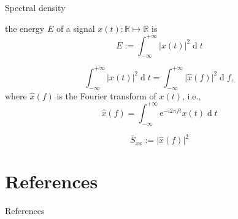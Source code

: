 \documentclass[utf-8, 10pt, aspectratio=1610]{beamer}
\begin{document}
\begin{frame}[allowframebreaks]{Spectral density}
	\begin{definition}[energy]
		the energy \(E\) of a signal \(x(t): \mathbb{R} \mapsto \mathbb{R}\) is
		\begin{equation}
			E := \int_{-\infty}^{+\infty} \vert x(t) \vert^2 \operatorname{d}\! t
		\end{equation}
	\end{definition}
	\begin{theorem}
		\begin{equation}
			\int_{-\infty}^{+\infty} \vert x(t) \vert^2 \operatorname{d}\! t = \int_{-\infty}^{+\infty} \vert \hat{x}(f) \vert^2 \operatorname{d}\! f,
		\end{equation}
		where \(\hat{x}(f)\) is the Fourier transform of \(x(t)\), i.e.,
		\begin{equation}
			\hat{x}(f) = \int_{-\infty}^{+\infty} \mathrm{e}^{-\mathrm{i}2\pi f t} x(t) \operatorname{d}\! t
		\end{equation}
	\end{theorem}

	\framebreak
	\begin{definition}
		\begin{equation}
			\bar{S}_{xx} := \vert \hat{x}(f) \vert^2
		\end{equation}
	\end{definition}
	\begin{theorem}

	\end{theorem}
\end{frame}
\appendix
\section{References}
\begin{frame}[allowframebreaks]{References}
	\printbibliography[heading=none]
\end{frame}
\end{document}
